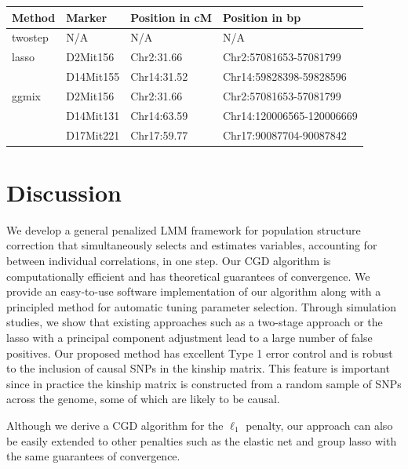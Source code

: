 \documentclass[12pt,letter]{article}\usepackage[]{graphicx}\usepackage[]{color}
\begin{document}
\begin{minipage}{\linewidth}
	\bigskip
	 \label{tab:Marker}
	\begin{tabular}{ C{1.25in} C{.85in} C{1.25in} C{2.5in}}\toprule[1.5pt]
		\bf Method & \bf Marker & \bf Position in cM & \bf Position in bp\\\midrule
		twostep & N/A & N/A & N/A\\
		lasso & D2Mit156 & Chr2:31.66 & Chr2:57081653-57081799\\
		& D14Mit155 & Chr14:31.52 & Chr14:59828398-59828596\\
		ggmix & D2Mit156 & Chr2:31.66 & Chr2:57081653-57081799\\
		& D14Mit131 & Chr14:63.59 & Chr14:120006565-120006669\\
		& D17Mit221 & Chr17:59.77 & Chr17:90087704-90087842\\
		\bottomrule[1.25pt]
		\end {tabular}\par
		\bigskip
	\end{minipage}



\section{Discussion}

We develop a general penalized LMM framework for population structure correction that simultaneously selects and estimates variables, accounting for between individual correlations, in one step.
Our CGD algorithm is computationally efficient and has theoretical guarantees of convergence.
We provide an easy-to-use software implementation of our algorithm along with a principled method for automatic tuning parameter selection.
Through simulation studies, we show that existing approaches such as a two-stage approach or the lasso with a principal component adjustment lead to a large number of false positives.
Our proposed method has excellent Type 1 error control and is robust to the inclusion of causal SNPs in the kinship matrix. This feature is important since in practice the kinship matrix is constructed from a random sample of SNPs across the genome, some of which are likely to be causal.

Although we derive a CGD algorithm for the $\ell_1$ penalty, our approach can also be easily extended to other penalties such as the elastic net and group lasso with the same guarantees of convergence.
\end{document}
